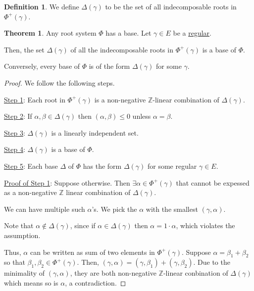 \documentclass{article}
\theoremstyle{definition}
\newtheorem*{definition}{Definition}
\newtheorem{theorem}{Theorem}[section]
\begin{document}
\begin{definition}
    We define \(\Delta (\gamma)\) to be the set of all indecomposable roots in \(\Phi^+(\gamma)\).
\end{definition}

\begin{theorem}
    Any root system \(\Phi\) has a base. Let \(\gamma \in E\) be a \underline{regular}.

    Then, the set \(\Delta (\gamma)\) of all the indecomposable roots in \(\Phi^+(\gamma)\) is a base of \(\Phi\). 

    Conversely, every base of \(\Phi\) is of the form \(\Delta(\gamma)\) for some \(\gamma\).
\end{theorem}

\begin{proof}
    We follow the following steps.
    
    \underline{Step 1}: Each root in \(\Phi^+(\gamma)\) is a non-negative \(\mathbb{Z}\)-linear combination of \(\Delta(\gamma)\). 

    \underline{Step 2}: If \(\alpha , \beta \in \Delta (\gamma)\) then \((\alpha , \beta) \leq 0\) unless \(\alpha = \beta\). 

    \underline{Step 3}: \(\Delta (\gamma)\) is a linearly independent set.

    \underline{Step 4}: \(\Delta (\gamma)\) is a base of \(\Phi\). 

    \underline{Step 5}: Each base \(\Delta\) of \(\Phi\) has the form \(\Delta (\gamma)\) for some regular \(\gamma \in E\). 

    \underline{Proof of Step 1}: Suppose otherwise. Then \(\exists \alpha \in \Phi^+(\gamma)\) that cannot be expessed as a non-negative \(\mathbb{Z}\) linear combination of \(\Delta (\gamma)\).

    We can have multiple such \(\alpha \)'s. We pick the \(\alpha\) with the smallest \((\gamma , \alpha)\).

    Note that \(\alpha \notin \Delta (\gamma)\), since if \(\alpha \in \Delta (\gamma)\) then \(\alpha = 1\cdot \alpha\), which violates the assumption. 

    Thus, \(\alpha\) can be written as sum of two elements in \(\Phi^+(\gamma)\). Suppose \(\alpha = \beta_1 + \beta_2\) so that \(\beta_1, \beta_2 \in \Phi^+(\gamma)\). Then, \((\gamma , \alpha) = (\gamma , \beta_1) + (\gamma, \beta_2)\). Due to the minimality of \((\gamma ,\alpha)\), they are both non-negative \(\mathbb{Z}\)-linear conbination of \(\Delta (\gamma)\) which means so is \(\alpha\), a contradiction.


\end{proof}
\end{document}
